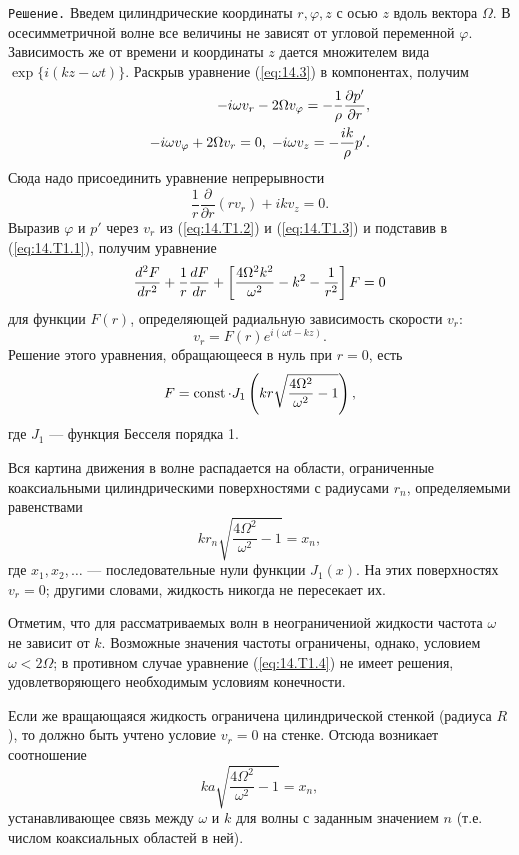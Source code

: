 \texttt{Решение.} Введем цилиндрические координаты $r,\varphi,z$ с осью $z$
вдоль вектора $\Omega$. В осесимметричной волне все величины не зависят от
угловой переменной $\varphi$. Зависимость же от времени и координаты $z$ дается
множителем вида $\exp{\lbrace i(kz - \omega t)\rbrace}$. Раскрыв уравнение
(\ref{eq:14.3}) в компонентах, получим
\begin{eqnarray}
   \label{eq:14.T1.1}
   -i\omega v_r - 2\Omega v_{\varphi} = - \frac1{\rho}\frac{\partial{p'}}{\partial{r}},\\
   \label{eq:14.T1.2}
   -i\omega v_{\varphi} + 2\Omega v_r = 0, \; -i\omega v_z = - \frac{ik}{\rho}p'.
\end{eqnarray}
Сюда надо присоединить уравнение непрерывности
\begin{equation}
   \label{eq:14.T1.3}
   \frac1{r}\frac{\partial}{\partial r}(r v_r) + ikv_z = 0.
\end{equation}
Выразив $\varphi$ и $p'$ через $v_r$ из (\ref{eq:14.T1.2}) и (\ref{eq:14.T1.3}) и подставив в (\ref{eq:14.T1.1}), получим
уравнение
\begin{equation}
   \label{eq:14.T1.4}
   \frac{d^2F}{dr^2} + \frac1{r}\frac{d{F}}{d{r}} +
   \left\lbrack \frac{4\Omega^2k^2}{\omega^2} - k^2 - \frac1{r^2} \right\rbrack F = 0
\end{equation}
для функции $F(r)$, определяющей радиальную зависимость скорости $v_r$:
\[
   v_r = F(r)e^{i(\omega t - kz)}.
\]
Решение этого уравнения, обращающееся в нуль при $r = 0$, есть
\begin{equation}
   \label{eq:14.T1.5}
   F = \mathop{\mathrm{const}}\nolimits\cdot J_1 \left( kr\sqrt{\frac{4\Omega^2}{\omega^2}-1} \right),
\end{equation}
где $J_1$ — функция Бесселя порядка 1.

Вся картина движения в волне распадается на области, ограниченные коаксиальными
цилиндрическими поверхностями с радиусами $r_n$, определяемыми равенствами
\[
   kr_n\sqrt{\frac{4\Omega^2}{\omega^2}-1} = x_n,
\]
где $x_1,x_2,\dots$ — последовательные нули функции $J_1(x)$. На этих
поверхностях $v_r= 0$; другими словами, жидкость никогда не пересекает их.

Отметим, что для рассматриваемых волн в неограничениой жидкости частота $\omega$
не зависит от $k$. Возможные значения частоты ограничены, однако, условием
$\omega < 2\Omega$; в противном случае уравнение (\ref{eq:14.T1.4}) не имеет решения,
удовлетворяющего необходимым условиям конечности.

Если же вращающаяся жидкость ограничена цилиндрической стенкой (радиуса $R$), то
должно быть учтено условие $v_r = 0$ на стенке. Отсюда возникает соотношение
\[
   ka\sqrt{\frac{4\Omega^2}{\omega^2}-1} = x_n,
\]
устанавливающее связь между $\omega$ и $k$ для волны с заданным значением $n$
(т.е. числом коаксиальных областей в ней).


